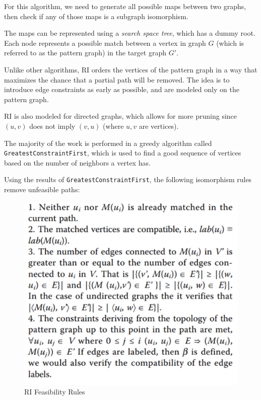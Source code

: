\documentclass{article}
\begin{document}
  For this algorithm, we need to generate all possible maps between two graphs, then check if any of those maps is a subgraph isomorphism.

  The maps can be represented using a \textit{search space tree}, which has a dummy root. Each node represents a possible match between a vertex in graph $G$ (which is referred to as the pattern graph) in the target graph $G'$.

  Unlike other algorithms, RI orders the vertices of the pattern graph in a way that maximizes the chance that a partial path will be removed. The idea is to introduce edge constraints as early as possible, and are modeled only on the pattern graph.

  RI is also modeled for directed graphs, which allows for more pruning since $(u,v)$ does not imply $(v, u)$ (where $u, v$ are vertices).

  The majority of the work is performed in a greedy algorithm called \texttt{GreatestConstraintFirst}, which is used to find a good sequence of vertices based on the number of neighbors a vertex has.

  Using the results of \texttt{GreatestConstraintFirst}, the following isomorphism rules remove unfeasible paths:

  \begin{figure}[H]
    \centering
    \includegraphics{images/ri_rules.png}
    \caption{RI Feasibility Rules}
    \label{ri_feas}
  \end{figure}
\end{document}
